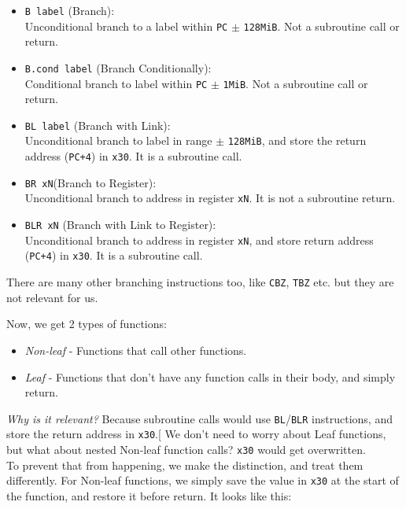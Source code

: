 \documentclass[a4paper, nobind]{templates/ociamthesis}
\providecommand{\tightlist}{%
  \setlength{\itemsep}{0pt}\setlength{\parskip}{0pt}}
\begin{document}
\begin{itemize}
\tightlist
\item
  \texttt{B\ label} (Branch):\\
  Unconditional branch to a label within \texttt{PC} \(\pm\) \texttt{128MiB}.
  Not a subroutine call or return.
\item
  \texttt{B.cond\ label} (Branch Conditionally):\\
  Conditional branch to label within \texttt{PC} \(\pm\) \texttt{1MiB}.
  Not a subroutine call or return.
\item
  \texttt{BL\ label} (Branch with Link):\\
  Unconditional branch to label in range \(\pm\) \texttt{128MiB},
  and store the return address (\texttt{PC+4}) in \texttt{x30}.
  It is a subroutine call.
\item
  \texttt{BR\ xN}(Branch to Register):\\
  Unconditional branch to address in register \texttt{xN}.
  It is not a subroutine return.
\item
  \texttt{BLR\ xN} (Branch with Link to Register):\\
  Unconditional branch to address in register \texttt{xN},
  and store return address (\texttt{PC+4}) in \texttt{x30}.
  It is a subroutine call.
\end{itemize}

There are many other branching instructions too, like \texttt{CBZ}, \texttt{TBZ} etc.
but they are not relevant for us.

Now, we get 2 types of functions:

\begin{itemize}
\tightlist
\item
  \emph{Non-leaf} - Functions that call other functions.
\item
  \emph{Leaf} - Functions that don't have any function calls in their body, and simply return.
\end{itemize}

\emph{Why is it relevant?}
Because subroutine calls would use \texttt{BL}/\texttt{BLR} instructions,
and store the return address in \texttt{x30}.{[}\citeproc{ref-arm-arch-manual}{7}{]}
We don't need to worry about Leaf functions,
but what about nested Non-leaf function calls? \texttt{x30} would get overwritten.\\
To prevent that from happening, we make the distinction, and treat them differently.
For Non-leaf functions, we simply save the value in \texttt{x30} at the start of the function,
and restore it before return. It looks like this:
\end{document}
